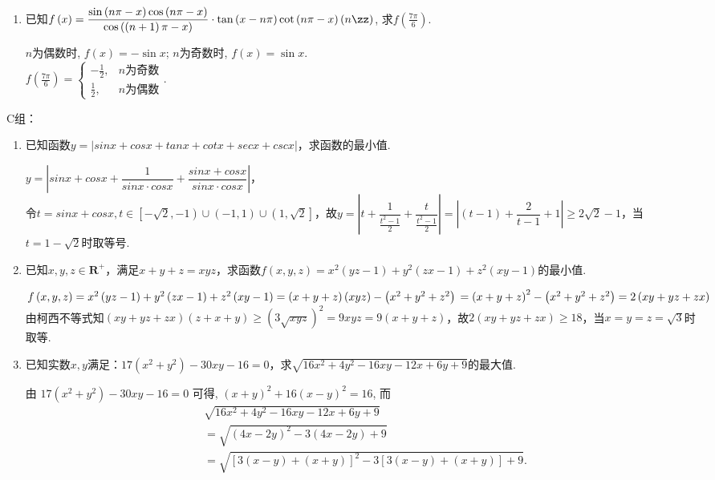 \begin{enumerate}
\item 已知$f\left(x\right)=\dfrac{\sin\left(n\pi-x\right)\cos\left(n\pi-x\right)}{\cos\left(\left(n+1\right)\pi-x\right)}\cdot\tan\left(x-n\pi\right)\cot\left(n\pi-x\right)\left(n\zz\right)$, 求$f\left(\frac{7\pi}{6}\right)$. 
\begin{jieda}
$n$为偶数时, $f\left(x\right)=-\sin{x}$; $n$为奇数时, $f\left(x\right)=\sin{x}$. \\
$f\left(\frac{7\pi}{6}\right)=\begin{cases}
-\frac{1}{2}, & n\text{为奇数}\\
\frac{1}{2}, & n\text{为偶数}
\end{cases}$. 
\end{jieda}

\end{enumerate}
C组：
\begin{enumerate}
    \item 已知函数$y = |sinx + cosx + tanx + cotx + secx + cscx|$，求函数的最小值.
    \begin{jieda}
        $y = |sinx + cosx + \dfrac{1}{sinx \cdot cosx} + \dfrac{sinx + cosx}{sinx \cdot cosx}|$，\\
        令$t = sinx + cosx, t \in \left[-\sqrt{2}, -1\right) \cup \left(-1, 1\right) \cup \left(1, \sqrt{2}\right]$，故$y = |t + \dfrac{1}{\frac{t^2 - 1}{2}} + \dfrac{t}{\frac{t^2 - 1}{2}}| = |\left(t-1\right) + \dfrac{2}{t-1} + 1| \geq 2\sqrt{2} - 1$，当$t = 1-\sqrt{2}$时取等号.
    \end{jieda}
    \item 已知$x, y, z \in \mathbf{R^+}$，满足$x+y+z = xyz$，求函数$f\left(x,y,z\right) = x^2\left(yz-1\right)+y^2\left(zx-1\right)+z^2\left(xy-1\right)$的最小值.
    \begin{jieda}
        $f\left(x,y,z\right) = x^2\left(yz-1\right)+y^2\left(zx-1\right)+z^2\left(xy-1\right) = \left(x+y+z\right)\left(xyz\right)-\left(x^2+y^2+z^2\right) \\
        = \left(x+y+z\right)^2-\left(x^2+y^2+z^2\right) = 2\left(xy+yz+zx\right)$ \\
        由柯西不等式知$\left(xy+yz+zx\right)\left(z+x+y\right) \geq \left(3\sqrt{xyz}\right)^2 = 9xyz = 9\left(x+y+z\right)$，故$2\left(xy+yz+zx\right) \geq 18$，当$x = y = z = \sqrt{3}$时取等.
    \end{jieda}
    
    \item 已知实数$x, y$满足：$17\left(x^2+y^2\right)-30xy-16 = 0$，求$\sqrt{16x^2 + 4y^2-16xy - 12x+6y + 9}$的最大值.
    \begin{jieda}
由 $17\left(x^2+y^2\right)-30 x y-16=0$ 可得, $\left(x+y\right)^2+16\left(x-y\right)^2=16$,
而
$$
\begin{aligned}
&\sqrt{16 x^2+4 y^2-16 x y-12 x+6 y+9} \\
& =\sqrt{\left(4 x-2 y\right)^2-3\left(4 x-2 y\right)+9} \\
& =\sqrt{[3\left(x-y\right)+\left(x+y\right)]^2-3[3\left(x-y\right)+\left(x+y\right)]+9} .
\end{aligned}
$$



\end{jieda}
\end{enumerate}
